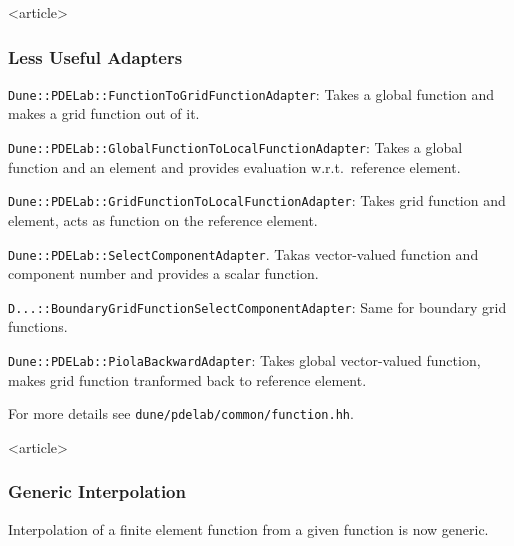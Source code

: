 \begin{frame}<article>
\frametitle{Less Useful Adapters}
\lstinline{Dune::PDELab::FunctionToGridFunctionAdapter}: Takes a global
function and makes a grid function out of it.

\lstinline{Dune::PDELab::GlobalFunctionToLocalFunctionAdapter}:
Takes a global function and an element and provides evaluation
w.r.t.~reference element.

\lstinline{Dune::PDELab::GridFunctionToLocalFunctionAdapter}:
Takes grid function and element, acts as function on the
reference element.

\lstinline{Dune::PDELab::SelectComponentAdapter}. Takas
vector-valued function and component number and provides a scalar function.

\lstinline{D...::BoundaryGridFunctionSelectComponentAdapter}:
Same for boundary grid functions.

\lstinline{Dune::PDELab::PiolaBackwardAdapter}: Takes global
vector-valued function, makes grid function tranformed back to
reference element.

For more details see \lstinline{dune/pdelab/common/function.hh}.
\end{frame}

%

\begin{frame}<article>
\frametitle{Generic Interpolation}
Interpolation of a finite element function from a given function is
now generic.
\end{frame}

%

